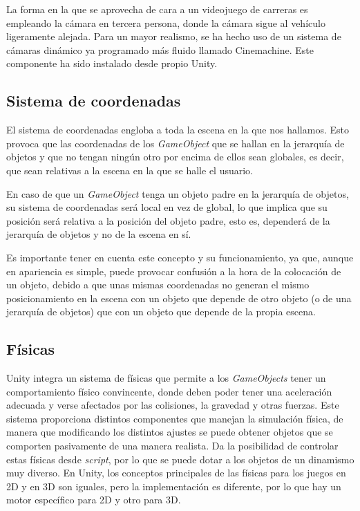 La forma en la que se aprovecha de cara a un videojuego de carreras es empleando la cámara en tercera persona, donde la cámara sigue al vehículo ligeramente alejada. Para un mayor realismo, se ha hecho uso de un sistema de cámaras dinámico ya programado más fluido llamado Cinemachine. Este componente ha sido instalado desde propio Unity.

\subsection{Sistema de coordenadas}

El sistema de coordenadas engloba a toda la escena en la que nos hallamos. Esto provoca que las coordenadas de los \textit{GameObject} que se hallan en la jerarquía de objetos y que no tengan ningún otro por encima de ellos sean globales, es decir, que sean relativas a la escena en la que se halle el usuario. 

En caso de que un \textit{GameObject} tenga un objeto padre en la jerarquía de objetos, su sistema de coordenadas será local en vez de global, lo que implica que su posición será relativa a la posición del objeto padre, esto es, dependerá de la jerarquía de objetos y no de la escena en sí.

Es importante tener en cuenta este concepto y su funcionamiento, ya que, aunque en apariencia es simple, puede provocar confusión a la hora de la colocación de un objeto, debido a que unas mismas coordenadas no generan el mismo posicionamiento en la escena con un objeto que depende de otro objeto (o de una jerarquía de objetos) que con un objeto que depende de la propia escena.

\subsection{Físicas}

Unity integra un sistema de físicas que permite a los \textit{GameObjects} tener un comportamiento físico convincente, donde deben poder tener una aceleración adecuada y verse afectados por las colisiones, la gravedad y otras fuerzas. Este sistema proporciona distintos componentes que manejan la simulación física, de manera que modificando los distintos ajustes se puede obtener objetos que se comporten pasivamente de una manera realista. Da la posibilidad de controlar estas físicas desde \textit{script}, por lo que se puede dotar a los objetos de un dinamismo muy diverso. En Unity, los conceptos principales de las físicas para los juegos en 2D y en 3D son iguales, pero la implementación es diferente, por lo que hay un motor específico para 2D y otro para 3D.

